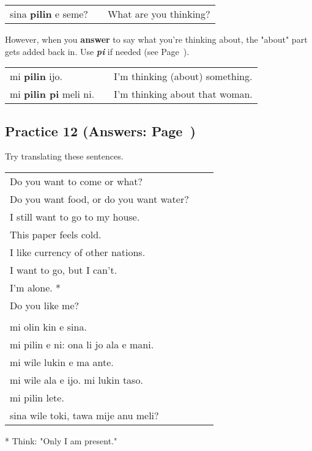 \begin{supertabular}{p{5,5cm}|ll}
sina \textbf{pilin} e seme? && What are you thinking? \\
\end{supertabular} 

However, when you \textbf{answer} to say what you're thinking about, the "about" part gets added back in. 
Use \textbf{\textit{pi}} if needed (see Page~\pageref{'mistakes_with_pi'}).

\begin{supertabular}{p{5,5cm}|ll}
mi \textbf{pilin} ijo. && I'm thinking (about) something. \\
mi \textbf{pilin pi} meli ni. && I'm thinking about that woman. \\
\end{supertabular} 
% 
\newpage
\subsection*{Practice 12 (Answers: Page~\pageref{'conjunctions_temperature'})}
%
Try translating these sentences. 

\begin{supertabular}{p{5,5cm}|ll}
   Do you want to come or what?    \\ %
   Do you want food, or do you want water?    \\ %
   I still want to go to my house.    \\ %
   This paper feels cold.    \\ %
   I like currency of other nations.   \\  %
   I want to go, but I can't.    \\ %
   I'm alone. *  \\ %
   Do you like me?   &&   \\ %
 && \\ %
   mi olin kin e sina.    \\ %
   mi pilin e ni: ona li jo ala e mani.    \\ %
   mi wile lukin e ma ante.    \\ %
   mi wile ala e ijo. mi lukin taso.    \\ %
   mi pilin lete.    \\ %
   sina wile toki, tawa mije anu meli?    \\ %
\end{supertabular} 

* Think: "Only I am present."
%
